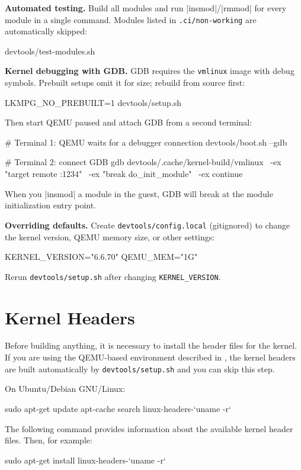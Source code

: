 \documentclass[10pt, oneside]{book}
\begin{document}
\textbf{Automated testing.}
Build all modules and run \sh|insmod|/\sh|rmmod| for every module in a single
command.
Modules listed in \verb|.ci/non-working| are automatically skipped:
\begin{codebash}
devtools/test-modules.sh
\end{codebash}

\textbf{Kernel debugging with GDB.}
GDB requires the \verb|vmlinux| image with debug symbols.
Prebuilt setups omit it for size; rebuild from source first:
\begin{codebash}
LKMPG_NO_PREBUILT=1 devtools/setup.sh
\end{codebash}

Then start QEMU paused and attach GDB from a second terminal:
\begin{codebash}
# Terminal 1: QEMU waits for a debugger connection
devtools/boot.sh --gdb

# Terminal 2: connect GDB
gdb devtools/.cache/kernel-build/vmlinux \
    -ex "target remote :1234" \
    -ex "break do_init_module" \
    -ex continue
\end{codebash}
When you \sh|insmod| a module in the guest, GDB will break at the module
initialization entry point.

\textbf{Overriding defaults.}
Create \verb|devtools/config.local| (gitignored) to change the kernel version,
QEMU memory size, or other settings:
\begin{code}
KERNEL_VERSION="6.6.70"
QEMU_MEM="1G"
\end{code}
Rerun \verb|devtools/setup.sh| after changing \verb|KERNEL_VERSION|.

\section{Kernel Headers}
\label{sec:headers}
Before building anything, it is necessary to install the header files for the kernel.
If you are using the QEMU-based environment described in ,
the kernel headers are built automatically by \verb|devtools/setup.sh| and you can
skip this step.

On Ubuntu/Debian GNU/Linux:
\begin{codebash}
sudo apt-get update
apt-cache search linux-headers-`uname -r`
\end{codebash}

The following command provides information about the available kernel header files.
Then, for example:
\begin{codebash}
sudo apt-get install linux-headers-`uname -r`
\end{codebash}
\end{document}
